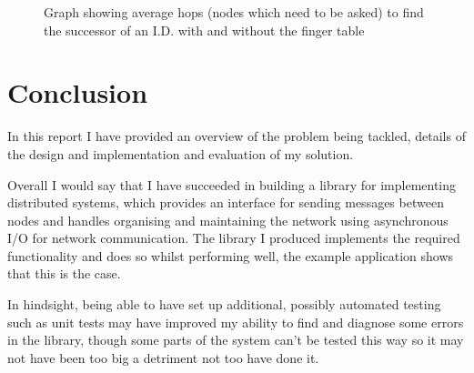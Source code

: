 \documentclass{article}
\begin{document}
\begin{figure}
\begin{center}
\end{center}
\caption{Graph showing average hops (nodes which need to be asked) to find the successor of an I.D. with and without the finger table}
\label{fig:fingerperf}
\end{figure}




\section{Conclusion}

In this report I have provided an overview of the problem being tackled, details of the design and implementation and evaluation of my solution.

Overall I would say that I have succeeded in building a library for implementing distributed systems, which provides an interface for sending messages between nodes and handles organising and maintaining the network using asynchronous I/O for network communication. The library I produced implements the required functionality and does so whilst performing well, the example application shows that this is the case.

In hindsight, being able to have set up additional, possibly automated testing such as unit tests may have improved my ability to find and diagnose some errors in the library, though some parts of the system can't be tested this way so it may not have been too big a detriment not too have done it.
\end{document}
